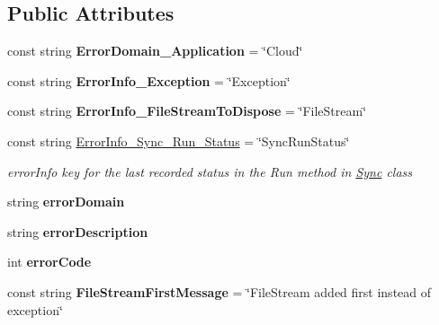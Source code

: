 \subsection*{Public Attributes}
\begin{DoxyCompactItemize}
\item 
\hypertarget{class_cloud_api_public_1_1_model_1_1_c_l_error_a426856d7b4ca111a75edaabcc7c167ba}{const string {\bfseries Error\-Domain\-\_\-\-Application} = \char`\"{}Cloud\char`\"{}}\label{class_cloud_api_public_1_1_model_1_1_c_l_error_a426856d7b4ca111a75edaabcc7c167ba}

\item 
\hypertarget{class_cloud_api_public_1_1_model_1_1_c_l_error_ac7100be19df847427ccd5c74345aad6a}{const string {\bfseries Error\-Info\-\_\-\-Exception} = \char`\"{}Exception\char`\"{}}\label{class_cloud_api_public_1_1_model_1_1_c_l_error_ac7100be19df847427ccd5c74345aad6a}

\item 
\hypertarget{class_cloud_api_public_1_1_model_1_1_c_l_error_ada50a3cbda5e6daa5f7b937d8acf88ec}{const string {\bfseries Error\-Info\-\_\-\-File\-Stream\-To\-Dispose} = \char`\"{}File\-Stream\char`\"{}}\label{class_cloud_api_public_1_1_model_1_1_c_l_error_ada50a3cbda5e6daa5f7b937d8acf88ec}

\item 
const string \hyperlink{class_cloud_api_public_1_1_model_1_1_c_l_error_a94652dc5f5c6747124cf4dded0ee17b0}{Error\-Info\-\_\-\-Sync\-\_\-\-Run\-\_\-\-Status} = \char`\"{}Sync\-Run\-Status\char`\"{}
\begin{DoxyCompactList}\small\item\em error\-Info key for the last recorded status in the Run method in \hyperlink{namespace_cloud_api_public_1_1_sync}{Sync} class \end{DoxyCompactList}\item 
\hypertarget{class_cloud_api_public_1_1_model_1_1_c_l_error_a8ecf0d21fc8589394a428ac324a1a6e9}{string {\bfseries error\-Domain}}\label{class_cloud_api_public_1_1_model_1_1_c_l_error_a8ecf0d21fc8589394a428ac324a1a6e9}

\item 
\hypertarget{class_cloud_api_public_1_1_model_1_1_c_l_error_a9c44064de990a9ed6966412ac9e42629}{string {\bfseries error\-Description}}\label{class_cloud_api_public_1_1_model_1_1_c_l_error_a9c44064de990a9ed6966412ac9e42629}

\item 
\hypertarget{class_cloud_api_public_1_1_model_1_1_c_l_error_a28253daef958732303fb02d49a0a28ed}{int {\bfseries error\-Code}}\label{class_cloud_api_public_1_1_model_1_1_c_l_error_a28253daef958732303fb02d49a0a28ed}

\item 
\hypertarget{class_cloud_api_public_1_1_model_1_1_c_l_error_addcadeb1e44fb42379f81fb4289b17e7}{const string {\bfseries File\-Stream\-First\-Message} = \char`\"{}File\-Stream added first instead of exception\char`\"{}}\label{class_cloud_api_public_1_1_model_1_1_c_l_error_addcadeb1e44fb42379f81fb4289b17e7}

\end{DoxyCompactItemize}
